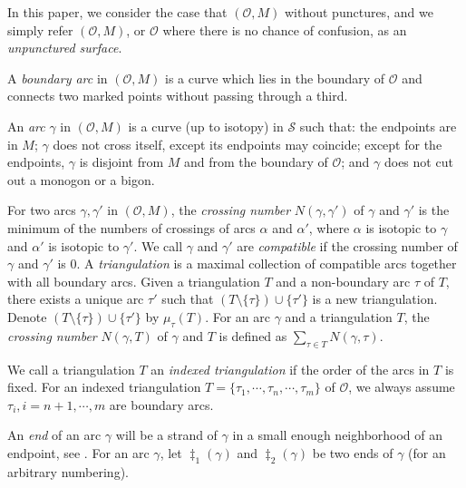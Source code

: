 \documentclass[10pt]{amsart}
\theoremstyle{theorems}
\begin{document}
\medskip

In this paper, we consider the case that $(\mathcal O,M)$ without punctures, and we simply refer $(\mathcal O, M)$, or $\mathcal O$ where there is no chance of confusion, as an \emph{unpunctured surface}.

\medskip

A \emph{boundary arc} in $(\mathcal O, M)$ is a curve which lies in the boundary of $\mathcal O$ and connects two marked points without passing through a third.

\medskip

An \emph{arc} $\gamma$ in $(\mathcal O, M)$ is a curve (up to isotopy) in $\mathcal S$ such that: the endpoints are in $M$; $\gamma$ does not cross itself, except its endpoints may coincide; except for the endpoints, $\gamma$ is disjoint from $M$ and from the boundary of $\mathcal O$; and $\gamma$ does not cut
out a monogon or a bigon.

\medskip

For two arcs $\gamma, \gamma'$ in $(\mathcal O, M)$, the \emph{crossing number} $N(\gamma,\gamma')$ of $\gamma$ and $\gamma'$ is the minimum of the numbers of crossings of arcs $\alpha$ and $\alpha'$, where $\alpha$ is isotopic to $\gamma$ and $\alpha'$ is isotopic to $\gamma'$. We call $\gamma$ and $\gamma'$ are \emph{compatible} if the crossing number of $\gamma$ and $\gamma'$ is 0. A \emph{triangulation} is a maximal collection of compatible arcs together with all boundary arcs. Given a triangulation $T$ and a non-boundary arc $\tau$ of $T$, there exists a unique arc $\tau'$ such that $(T\setminus \{\tau\})\cup \{\tau'\}$ is a new triangulation. Denote $(T\setminus \{\tau\})\cup \{\tau'\}$ by $\mu_{\tau}(T)$. For an arc $\gamma$ and a triangulation $T$, the \emph{crossing number} $N(\gamma,T)$ of $\gamma$ and $T$ is defined as $\sum_{\tau\in T}N(\gamma,\tau)$.

\medskip
We call a triangulation $T$ an \emph{indexed triangulation} if the order of the arcs in $T$ is fixed. For an indexed triangulation $T=\{\tau_1,\cdots,\tau_n,\cdots,\tau_m\}$ of $\mathcal O$, we always assume $\tau_i,i=n+1,\cdots,m$ are boundary arcs.

\medskip

An \emph{end} of an arc $\gamma$ will be a strand of $\gamma$ in a small enough neighborhood of an endpoint, see \cite{M}. For an arc $\gamma$, let $\ddag_1(\gamma)$ and $\ddag_2(\gamma)$ be two ends of $\gamma$ (for an arbitrary numbering).

\medskip
\end{document}
